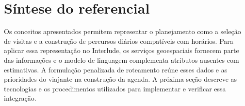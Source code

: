 \section{Síntese do referencial}

Os conceitos apresentados permitem representar o planejamento como a seleção de visitas e a construção de percursos diários compatíveis com horários. Para aplicar essa representação no Interlude, os serviços geoespaciais fornecem parte das informações e o modelo de linguagem complementa atributos ausentes com estimativas. A formulação penalizada de roteamento reúne esses dados e as prioridades do viajante na construção da agenda. A próxima seção descreve as tecnologias e os procedimentos utilizados para implementar e verificar essa integração.
